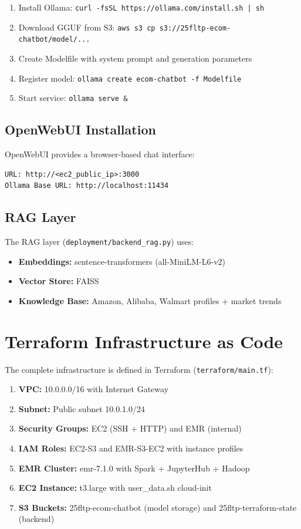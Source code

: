 \documentclass[12pt,a4paper]{article}
\begin{document}
\begin{enumerate}
    \item Install Ollama: \texttt{curl -fsSL https://ollama.com/install.sh | sh}
    \item Download GGUF from S3: \texttt{aws s3 cp s3://25fltp-ecom-chatbot/model/...}
    \item Create Modelfile with system prompt and generation parameters
    \item Register model: \texttt{ollama create ecom-chatbot -f Modelfile}
    \item Start service: \texttt{ollama serve \&}
\end{enumerate}

\subsection{OpenWebUI Installation}

OpenWebUI provides a browser-based chat interface:

\begin{verbatim}
URL: http://<ec2_public_ip>:3000
Ollama Base URL: http://localhost:11434
\end{verbatim}

\subsection{RAG Layer}

The RAG layer (\texttt{deployment/backend\_rag.py}) uses:

\begin{itemize}
    \item \textbf{Embeddings:} sentence-transformers (all-MiniLM-L6-v2)
    \item \textbf{Vector Store:} FAISS
    \item \textbf{Knowledge Base:} Amazon, Alibaba, Walmart profiles + market trends
\end{itemize}

\section{Terraform Infrastructure as Code}
\label{sec:terraform}

The complete infrastructure is defined in Terraform (\texttt{terraform/main.tf}):

\begin{enumerate}
    \item \textbf{VPC:} 10.0.0.0/16 with Internet Gateway
    \item \textbf{Subnet:} Public subnet 10.0.1.0/24
    \item \textbf{Security Groups:} EC2 (SSH + HTTP) and EMR (internal)
    \item \textbf{IAM Roles:} EC2-S3 and EMR-S3-EC2 with instance profiles
    \item \textbf{EMR Cluster:} emr-7.1.0 with Spark + JupyterHub + Hadoop
    \item \textbf{EC2 Instance:} t3.large with user\_data.sh cloud-init
    \item \textbf{S3 Buckets:} 25fltp-ecom-chatbot (model storage) and 25fltp-terraform-state (backend)
\end{enumerate}
\end{document}
